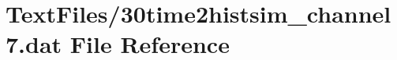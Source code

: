 \hypertarget{30time2histsim__channel7_8dat}{}\section{Text\+Files/30time2histsim\+\_\+channel7.dat File Reference}
\label{30time2histsim__channel7_8dat}
